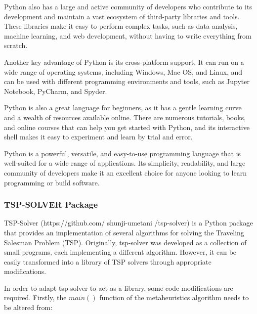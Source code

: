 \documentclass[conference]{IEEEtran}
\begin{document}
    Python also has a large and active community of developers who contribute to its development and maintain a vast ecosystem of third-party libraries and tools. These libraries make it easy to perform complex tasks, such as data analysis, machine learning, and web development, without having to write everything from scratch.

    Another key advantage of Python is its cross-platform support. It can run on a wide range of operating systems, including Windows, Mac OS, and Linux, and can be used with different programming environments and tools, such as Jupyter Notebook, PyCharm, and Spyder.

    Python is also a great language for beginners, as it has a gentle learning curve and a wealth of resources available online. There are numerous tutorials, books, and online courses that can help you get started with Python, and its interactive shell makes it easy to experiment and learn by trial and error.

    Python is a powerful, versatile, and easy-to-use programming language that is well-suited for a wide range of applications. Its simplicity, readability, and large community of developers make it an excellent choice for anyone looking to learn programming or build software.

    \subsubsection{TSP-SOLVER Package}

    TSP-Solver (https://github.com/ shunji-umetani /tsp-solver) is a Python package that provides an implementation of several algorithms for solving the Traveling Salesman Problem (TSP). Originally, tsp-solver was developed as a collection of small programs, each implementing a different algorithm. However, it can be easily transformed into a library of TSP solvers through appropriate modifications.

    In order to adapt tsp-solver to act as a library, some code modifications are required. Firstly, the $main()$ function of the metaheuristics algorithm needs to be altered from:
\end{document}
